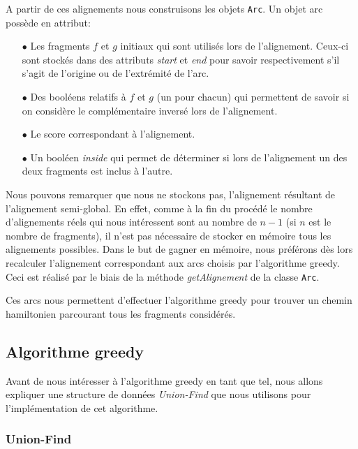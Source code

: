 A partir de ces alignements nous construisons les objets \verb|Arc|. Un objet arc possède en attribut:\\

\begin{itemize}
	\item[$\bullet$] Les fragments $f$ et $g$ initiaux qui sont utilisés lors de l'alignement. Ceux-ci sont stockés dans des attributs \emph{start} et \emph{end} pour savoir respectivement s'il s'agit de l'origine ou de l'extrémité de l'arc.
	\item[$\bullet$] Des booléens relatifs à $f$ et $g$ (un pour chacun) qui permettent de savoir si on considère le complémentaire inversé lors de l'alignement.
	\item[$\bullet$] Le score correspondant à l'alignement.
	\item[$\bullet$] Un booléen \emph{inside} qui permet de déterminer si lors de l'alignement un des deux fragments est inclus à l'autre.
	
\end{itemize}

Nous pouvons remarquer que nous ne stockons pas, l'alignement résultant de l'alignement semi-global. En effet, comme à la fin du procédé le nombre d'alignements réels qui nous intéressent sont au nombre de $n-1$ (si $n$ est le nombre de fragments), il n'est pas nécessaire de stocker en mémoire tous les alignements possibles. Dans le but de gagner en mémoire, nous préférons dès lors recalculer l'alignement correspondant aux arcs choisis par l'algorithme greedy. Ceci est réalisé par le biais de la méthode \emph{getAlignement} de la classe \verb|Arc|.

Ces arcs nous permettent d'effectuer l'algorithme greedy pour trouver un chemin hamiltonien parcourant tous les fragments considérés.


\subsection{Algorithme greedy}
\label{subsection:greedy}

Avant de nous intéresser à l'algorithme greedy en tant que tel, nous allons expliquer une structure de données \emph{Union-Find} que nous utilisons pour l'implémentation de cet algorithme.

\subsubsection{Union-Find}

